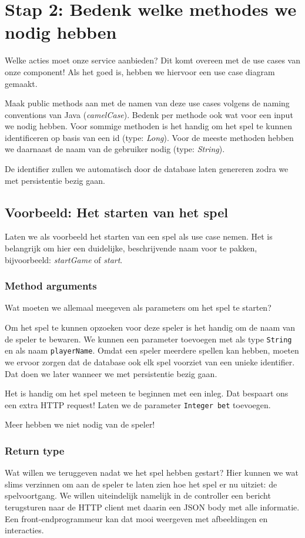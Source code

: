 \documentclass[dutch,a4paper,12pt,doubleside]{book}
\begin{document}
\section{Stap 2: Bedenk welke methodes we nodig hebben}
Welke acties moet onze service aanbieden? 
Dit komt overeen met de use cases van onze component! 
Als het goed is, hebben we hiervoor een use case diagram gemaakt.

Maak public methods aan met de namen van deze use cases volgens 
de naming conventions van Java (\textit{camelCase}). 
Bedenk per methode ook wat voor een input we nodig hebben.
Voor sommige methoden is het handig om het spel te kunnen identificeren
op basis van een id (type: \textit{Long}). Voor de meeste methoden hebben 
we daarnaast de naam van de gebruiker nodig (type: \textit{String}).

De identifier zullen we automatisch door de database laten genereren
zodra we met persistentie bezig gaan.

\subsection{Voorbeeld: Het starten van het spel}
Laten we als voorbeeld het starten van een spel als use case nemen.
Het is belangrijk om hier een duidelijke, beschrijvende naam voor te pakken,
bijvoorbeeld: \textit{startGame} of \textit{start}.

\subsubsection{Method arguments}
Wat moeten we allemaal meegeven als parameters om het spel te starten?

Om het spel te kunnen opzoeken voor deze speler is het handig om de naam van de speler  
te bewaren. We kunnen een parameter toevoegen met als type \texttt{String} en 
als naam \texttt{playerName}. 
Omdat een speler meerdere spellen kan hebben, moeten we ervoor zorgen 
dat de database ook elk spel voorziet van een unieke identifier. 
Dat doen we later wanneer we met persistentie bezig gaan.

Het is handig om het spel meteen te beginnen met een inleg. Dat bespaart ons een
extra HTTP request! Laten we de parameter \texttt{Integer bet} toevoegen.

Meer hebben we niet nodig van de speler!

\subsubsection{Return type}
Wat willen we teruggeven nadat we het spel hebben gestart? 
Hier kunnen we wat slims verzinnen om aan de speler te laten zien hoe 
het spel er nu uitziet: de spelvoortgang. 
We willen uiteindelijk namelijk in de controller
een bericht terugsturen naar de HTTP client met daarin een JSON body 
met alle informatie. Een front-endprogrammeur kan dat mooi weergeven met
afbeeldingen en interacties.
\end{document}
